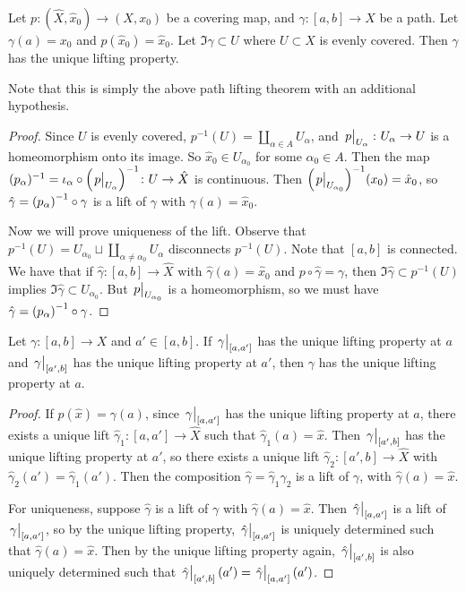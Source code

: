 \begin{lemma}
	Let \( p \colon (\hat X, \hat x_0) \to (X, x_0) \) be a covering map, and \( \gamma \colon [a,b] \to X \) be a path.
	Let \( \gamma(a) = x_0 \) and \( p(\hat x_0) = \hat x_0 \).
	Let \( \Im \gamma \subset U \) where \( U \subset X \) is evenly covered.
	Then \( \gamma \) has the unique lifting property.
\end{lemma}
Note that this is simply the above path lifting theorem with an additional hypothesis.
\begin{proof}
	Since \( U \) is evenly covered, \( p^{-1}(U) = \coprod_{\alpha \in A} U_\alpha \), and \( \eval{p}_{U_\alpha} \colon U_\alpha \to U \) is a homeomorphism onto its image.
	So \( \hat x_0 \in U_{\alpha_0} \) for some \( \alpha_0 \in A \).
	Then the map \( (p_\alpha)^{-1} = \iota_\alpha \circ \qty(\eval{p}_{U_\alpha})^{-1} \colon U \to \hat X \) is continuous.
	Then \( \qty(\eval{p}_{U_{\alpha_0}})^{-1}(x_0) = \hat x_0 \), so \( \hat \gamma = \qty(p_\alpha)^{-1} \circ \gamma \) is a lift of \( \gamma \) with \( \gamma(a) = \hat x_0 \).

	Now we will prove uniqueness of the lift.
	Observe that \( p^{-1}(U) = U_{\alpha_0} \sqcup \coprod_{\alpha \neq \alpha_0} U_\alpha \) disconnects \( p^{-1}(U) \).
	Note that \( [a,b] \) is connected.
	We have that if \( \hat\gamma \colon[a,b] \to \hat X \) with \( \hat \gamma(a) = \hat x_0 \) and \( p \circ \hat\gamma = \gamma \), then \( \Im \hat\gamma \subset p^{-1}(U) \) implies \( \Im \hat\gamma \subset U_{\alpha_0} \).
	But \( \eval{p}_{U_{\alpha_0}} \) is a homeomorphism, so we must have \( \hat \gamma = \qty(p_\alpha)^{-1} \circ \gamma \).
\end{proof}
\begin{lemma}
	Let \( \gamma \colon [a,b] \to X \) and \( a' \in [a,b] \).
	If \( \eval{\gamma}_{[a,a']} \) has the unique lifting property at \( a \) and \( \eval{\gamma}_{[a',b]} \) has the unique lifting property at \( a' \), then \( \gamma \) has the unique lifting property at \( a \).
\end{lemma}
\begin{proof}
	If \( p(\hat x) = \gamma(a) \), since \( \eval{\gamma}_{[a,a']} \) has the unique lifting property at \( a \), there exists a unique lift \( \hat\gamma_1 : [a,a'] \to \hat X \) such that \( \hat\gamma_1(a) = \hat x \).
	Then \( \eval{\gamma}_{[a',b]} \) has the unique lifting property at \( a' \), so there exists a unique lift \( \hat\gamma_2 \colon [a',b] \to \hat X \) with \( \hat\gamma_2(a') = \hat\gamma_1(a') \).
	Then the composition \( \hat\gamma=\hat\gamma_1\hat\gamma_2 \) is a lift of \( \gamma \), with \( \hat\gamma(a) = \hat x \).

	For uniqueness, suppose \( \hat\gamma \) is a lift of \( \gamma \) with \( \hat\gamma(a) = \hat x \).
	Then \( \eval{\hat\gamma}_{[a,a']} \) is a lift of \( \eval{\gamma}_{[a,a']} \), so by the unique lifting property, \( \eval{\hat\gamma}_{[a,a']} \) is uniquely determined such that \( \hat\gamma(a) = \hat x \).
	Then by the unique lifting property again, \( \eval{\hat\gamma}_{[a',b]} \) is also uniquely determined such that \( \eval{\hat\gamma}_{[a',b]}(a') = \eval{\hat\gamma}_{[a,a']}(a') \).
\end{proof}
